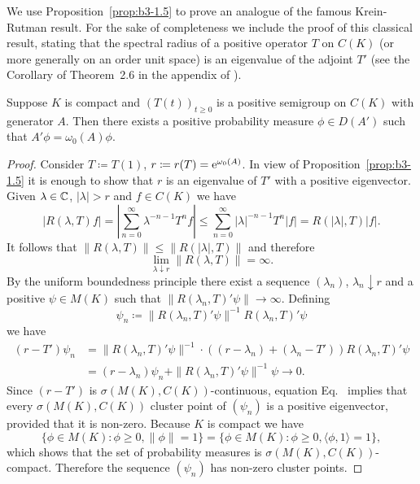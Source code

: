 We use Proposition~\ref{prop:b3-1.5} to prove an analogue of the famous Krein-Rutman result.
For the sake of completeness we include the proof of this classical result, stating that the spectral radius of a positive operator $T$ on $C(K)$ (or more generally on an order unit space) is an eigenvalue of the adjoint $T'$ (see the Corollary of Theorem~2.6 in the appendix of \textcite{schaefer:1966}).
\begin{theorem}\label{thm:b3-1.6}
	Suppose $K$ is compact and $(T(t))_{t \geq 0}$ is a positive semigroup on $C(K)$ with generator $A$.
	Then there exists a positive probability measure $\phi \in D(A')$ such that $A'\phi = \omega_{0}(A)\phi$.
\end{theorem}
\begin{proof}
	Consider $T \coloneq T(1)$, $r \coloneq r(T) = \mathrm{e}^{\omega_{0}(A)}$.
	In view of Proposition~\ref{prop:b3-1.5} it is enough to show that $r$ is an eigenvalue of\/ $T'$ with a positive eigenvector.
	Given $\lambda \in \mathbb{C}$, $|\lambda| > r$ and $f \in C(K)$ we have
	\[
	|R(\lambda,T)f| = \left|\sum_{n=0}^{\infty} \lambda^{-n-1} T^{n}f\right| \leq \sum_{n=0}^{\infty} |\lambda|^{-n-1} T^{n}|f| = R(|\lambda|,T) |f|.
	\]
	It follows that $\|R(\lambda,T)\| \leq \|R(|\lambda|,T)\|$ and therefore
	\begin{equation}\label{eq:b3-1.15}
		\lim_{\lambda \downarrow r}\|R(\lambda,T)\| = \infty.
	\end{equation}
	By the uniform boundedness principle there exist a sequence $(\lambda_{n})$, $\lambda_{n} \downarrow r$ and a positive $\psi \in M(K)$ such that $\|R(\lambda_{n},T)'\psi\| \to \infty$.
	Defining 
    \[
    \psi_{n} \coloneq \|R(\lambda_{n},T)'\psi\|^{-1}R(\lambda_{n},T)'\psi
    \] we have
	\begin{equation}\label{eq:b3-1.16}
		\begin{split}
		(r - T')\psi_{n} & = \|R(\lambda_{n},T)'\psi\|^{-1}\cdot((r-\lambda_{n}) + (\lambda_{n} - T'))R(\lambda_{n},T)'\psi\\ 
		& = (r-\lambda_{n})\psi_{n} + \|R(\lambda_{n},T)'\psi\|^{-1}\psi \to 0.
		\end{split}
	\end{equation}
	Since $(r - T')$ is $\sigma(M(K),C(K))$-continuous, equation Eq.~ implies that every $\sigma(M(K),C(K))$ cluster point of\/ $(\psi_{n})$ is a positive eigenvector, provided that it is non-zero.
	Because $K$ is compact we have 
%
\[
	\{\phi \in M(K) \colon \phi \geq 0, \|\phi\| = 1\} 
	= \{\phi \in M(K) \colon \phi \geq 0, \langle \phi,1 \rangle = 1\} , 
\]
which shows that the set of probability measures is $\sigma(M(K),C(K))$-compact.
	Therefore the sequence $(\psi_{n})$ has non-zero cluster points.
\end{proof}
